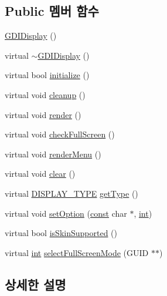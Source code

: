 \subsection*{Public 멤버 함수}
\begin{DoxyCompactItemize}
\item 
\mbox{\hyperlink{class_g_d_i_display_a31a11d8bcf225bc71429c054b776793c}{G\+D\+I\+Display}} ()
\item 
virtual \mbox{\hyperlink{class_g_d_i_display_afedb6dc098b7138a2dc311f1b9fd67ed}{$\sim$\+G\+D\+I\+Display}} ()
\item 
virtual bool \mbox{\hyperlink{class_g_d_i_display_a7d3e0b3443b68302d759d7cdecd718ef}{initialize}} ()
\item 
virtual void \mbox{\hyperlink{class_g_d_i_display_ac1bee01ce5982ad75f5d8883133b0ee9}{cleanup}} ()
\item 
virtual void \mbox{\hyperlink{class_g_d_i_display_a7c83b043ba5d2058b8419053615ffabc}{render}} ()
\item 
virtual void \mbox{\hyperlink{class_g_d_i_display_a515bce84bcfc615fe0bb983f2ce3e20b}{check\+Full\+Screen}} ()
\item 
virtual void \mbox{\hyperlink{class_g_d_i_display_a0d38608d640f217ded743d3c88dfe62a}{render\+Menu}} ()
\item 
virtual void \mbox{\hyperlink{class_g_d_i_display_a68a4add7ba35706237739a587131f463}{clear}} ()
\item 
virtual \mbox{\hyperlink{_display_8h_aa50f63b0688d0250e0be64d8401d09a0}{D\+I\+S\+P\+L\+A\+Y\+\_\+\+T\+Y\+PE}} \mbox{\hyperlink{class_g_d_i_display_a4c7acf65b39361a2a1479c71f6f404a7}{get\+Type}} ()
\item 
virtual void \mbox{\hyperlink{class_g_d_i_display_a4e8f52858b49c9132c77c2f14b13bead}{set\+Option}} (\mbox{\hyperlink{getopt1_8c_a2c212835823e3c54a8ab6d95c652660e}{const}} char $\ast$, \mbox{\hyperlink{_util_8cpp_a0ef32aa8672df19503a49fab2d0c8071}{int}})
\item 
virtual bool \mbox{\hyperlink{class_g_d_i_display_aa6c3c9482950413829f81f1aadae9929}{is\+Skin\+Supported}} ()
\item 
virtual \mbox{\hyperlink{_util_8cpp_a0ef32aa8672df19503a49fab2d0c8071}{int}} \mbox{\hyperlink{class_g_d_i_display_ace69c8ae01b3842aebfabb4f008c529d}{select\+Full\+Screen\+Mode}} (G\+U\+ID $\ast$$\ast$)
\end{DoxyCompactItemize}


\subsection{상세한 설명}


